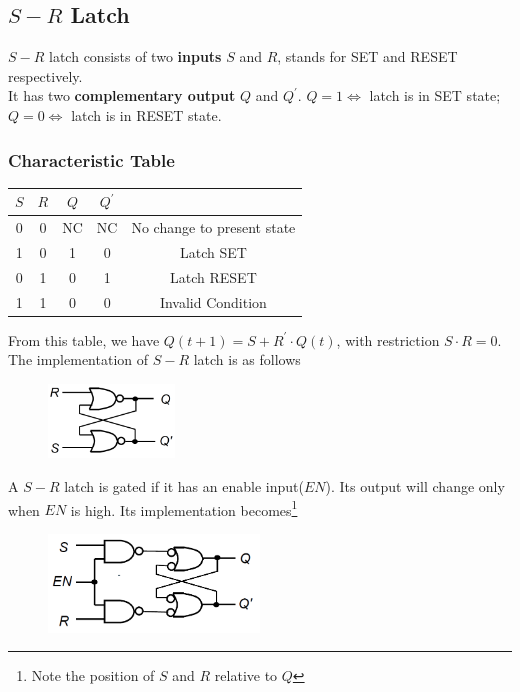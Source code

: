 \documentclass[12pt]{article}
\theoremstyle{definition}
\begin{document}
\subsection{$S-R$ Latch}
$S-R$ latch consists of two \textbf{inputs} $S$ and $R$, stands for SET and RESET respectively.\\It has two \textbf{complementary output} $Q$ and $Q^\prime$. $Q=1\Leftrightarrow$ latch is in SET state; $Q=0\Leftrightarrow$ latch is in RESET state.
\subsubsection{Characteristic Table}
\begin{table}[h]
\centering
\begin{tabular}{|c|c|c|c|c|}
\hline
$S$&$R$&$Q$&$Q^\prime$&\\\hline
0&0&NC&NC&No change to present state\\\hline
1&0&1&0&Latch SET\\\hline
0&1&0&1&Latch RESET\\\hline
1&1&0&0&Invalid Condition\\\hline
\end{tabular}
\end{table}
From this table, we have $Q(t+1) = S+R^\prime\cdot Q(t)$, with restriction $S\cdot R = 0$.\\
The implementation of $S-R$ latch is as follows
\begin{figure}[h]
\centering
\includegraphics[width = 0.3\textwidth]{8_1.png}
\end{figure}
A $S-R$ latch is gated if it has an enable input($EN$). Its output will change only when $EN$ is high. Its implementation becomes\footnote{Note the position of $S$ and $R$ relative to $Q$}
\clearpage
\begin{figure}[h]
\centering
\includegraphics[width = 0.5\textwidth]{8_2.png}
\end{figure} 
\end{document}
